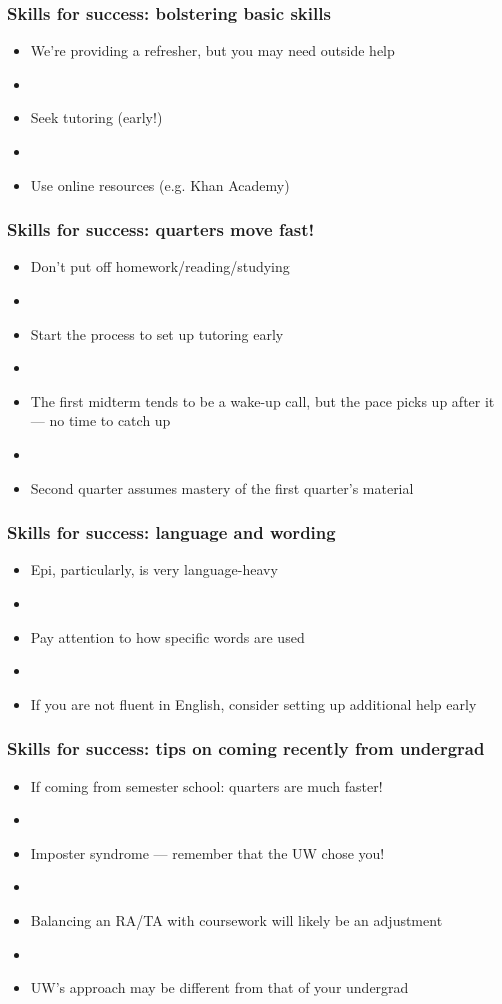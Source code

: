 \documentclass[12pt]{beamer}
\newcommand{\myframe}[1]{\begin{frame} \frametitle{#1}}
\begin{document}
\myframe{Skills for success: bolstering basic skills}
\begin{itemize}
\item We're providing a refresher, but you may need outside help
\item[]
\item Seek tutoring (early!)
\item[]
\item Use online resources (e.g. Khan Academy)
\end{itemize}
\end{frame}

\myframe{Skills for success: quarters move fast!}
\begin{itemize}
\item Don't put off homework/reading/studying
\item[]
\item Start the process to set up tutoring early
\item[]
\item The first midterm tends to be a wake-up call, but the pace picks up after it --- no time to catch up
\item[]
\item Second quarter assumes mastery of the first quarter's material
\end{itemize}
\end{frame}

\myframe{Skills for success: language and wording}
\begin{itemize}
\item Epi, particularly, is very language-heavy
\item[]
\item Pay attention to how specific words are used
\item[]
\item If you are not fluent in English, consider setting up additional help early
\end{itemize}
\end{frame}

\myframe{Skills for success: tips on coming recently from undergrad}
\begin{itemize}
\item If coming from semester school: quarters are much faster!
\item[]
\item Imposter syndrome --- remember that the UW chose you!
\item[]
\item Balancing an RA/TA with coursework will likely be an adjustment
\item[]
\item UW's approach may be different from that of your undergrad
\end{itemize}
\end{frame}
\end{document}
